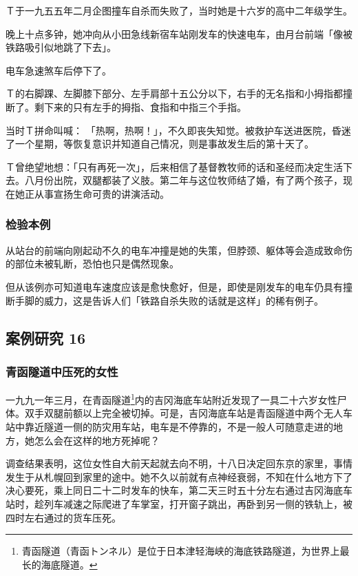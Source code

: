 \documentclass[UTF8]{ctexart}
\begin{document}
Ｔ于一九五五年二月企图撞车自杀而失败了，当时她是十六岁的高中二年级学生。

晚上十点多钟，她冲向从小田急线新宿车站刚发车的快速电车，由月台前端「像被铁路吸引似地跳了下去」。

电车急速煞车后停下了。

Ｔ的右脚踝、左脚膝下部分、左手肩部十五公分以下，右手的无名指和小拇指都撞断了。剩下来的只有左手的拇指、食指和中指三个手指。

当时Ｔ拼命叫喊： 「热啊，热啊！」，不久即丧失知觉。被救护车送进医院，昏迷了一个星期，等恢复意识并知道自己情况，则是事故发生后的第十天了。

Ｔ曾绝望地想：「只有再死一次」，后来相信了基督教牧师的话和圣经而决定生活下去。八月份出院，双腿都装了义肢。第二年与这位牧师结了婚，有了两个孩子，现在她正从事宣扬生命可贵的讲演活动。

\subsubsection*{检验本例}

从站台的前端向刚起动不久的电车冲撞是她的失策，但脖颈、躯体等会造成致命伤的部位未被轧断，恐怕也只是偶然现象。

但从该例亦可知道电车速度应该是愈快愈好，但是，即使是刚发车的电车仍具有撞断手脚的威力，这是告诉人们「铁路自杀失败的话就是这样」的稀有例子。

\subsection{案例研究 16}

\subsubsection*{青函隧道中压死的女性}

一九九一年三月，在青函隧道\footnote{青函隧道（青函トンネル）是位于日本津轻海峡的海底铁路隧道，为世界上最长的海底隧道。}内的吉冈海底车站附近发现了一具二十六岁女性尸体。双手双腿前额以上完全被切掉。可是，吉冈海底车站是青函隧道中两个无人车站中靠近隧道一侧的防灾用车站，电车是不停靠的，不是一般人可随意走进的地方，她怎么会在这样的地方死掉呢？

调查结果表明，这位女性自大前天起就去向不明，十八日决定回东京的家里，事情发生于从札幌回到家里的途中。她不久以前就有点神经衰弱，不知在什么地方下了决心要死，乘上同日二十二时发车的快车，第二天三时五十分左右通过吉冈海底车站时，趁列车减速之际爬进了车掌室，打开窗子跳出，再卧到另一侧的铁轨上，被四时左右通过的货车压死。
\end{document}
